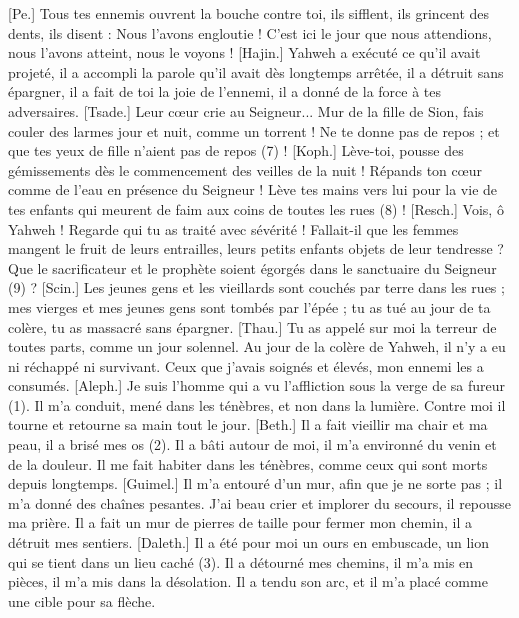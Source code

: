 \begin{multicols}{2}
[Pe.] Tous tes ennemis ouvrent la bouche contre toi, ils sifflent, ils grincent des dents, ils disent : Nous l'avons engloutie ! C’est ici le jour que nous attendions, nous l’avons atteint, nous le voyons !
[Hajin.] Yahweh a exécuté ce qu’il avait projeté, il a accompli la parole qu’il avait dès longtemps arrêtée, il a détruit sans épargner, il a fait de toi la joie de l'ennemi, il a donné de la force à tes adversaires.
[Tsade.] Leur cœur crie au Seigneur... Mur de la fille de Sion, fais couler des larmes jour et nuit, comme un torrent ! Ne te donne pas de repos ; et que tes yeux de fille n’aient pas de repos (7)  !
[Koph.] Lève-toi, pousse des gémissements dès le commencement des veilles de la nuit ! Répands ton cœur comme de l’eau en présence du Seigneur ! Lève tes mains vers lui pour la vie de tes enfants qui meurent de faim aux coins de toutes les rues (8) !
[Resch.] Vois, ô Yahweh ! Regarde qui tu as traité avec sévérité ! Fallait-il que les femmes mangent le fruit de leurs entrailles, leurs petits enfants objets de leur tendresse ? Que le sacrificateur et le prophète soient égorgés dans le sanctuaire du Seigneur (9) ?
[Scin.] Les jeunes gens et les vieillards sont couchés par terre dans les rues ; mes vierges et mes jeunes gens sont tombés par l’épée ; tu as tué au jour de ta colère, tu as massacré sans épargner.
[Thau.] Tu as appelé sur moi la terreur de toutes parts, comme un jour solennel. Au jour de la colère de Yahweh, il n'y a eu ni réchappé ni survivant. Ceux que j’avais soignés et élevés, mon ennemi les a consumés.
\VerseOne{}[Aleph.] Je suis l’homme qui a vu l’affliction sous la verge de sa fureur (1).
Il m’a conduit, mené dans les ténèbres, et non dans la lumière.
Contre moi il tourne et retourne sa main tout le jour.
[Beth.] Il a fait vieillir ma chair et ma peau, il a brisé mes os (2).
Il a bâti autour de moi, il m’a environné du venin et de la douleur.
Il me fait habiter dans les ténèbres, comme ceux qui sont morts depuis longtemps.
[Guimel.] Il m'a entouré d'un mur, afin que je ne sorte pas ; il m'a donné des chaînes pesantes.
J'ai beau crier et implorer du secours, il repousse ma prière.
Il a fait un mur de pierres de taille pour fermer mon chemin, il a détruit mes sentiers.
[Daleth.] Il a été pour moi un ours en embuscade, un lion qui se tient dans un lieu caché (3).
Il a détourné mes chemins, il m’a mis en pièces, il m’a mis dans la désolation.
Il a tendu son arc, et il m’a placé comme une cible pour sa flèche.

\end{multicols}
